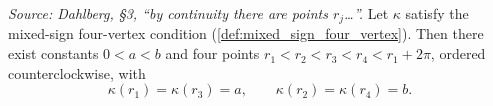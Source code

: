 \begin{lemma}

  \label{lem:dahlberg_alignment_data}
  \textit{Source: Dahlberg, §3, ``by continuity there are points $r_j$\ldots''.}
  Let $\kappa$ satisfy the mixed-sign four-vertex condition
  (\cref{def:mixed_sign_four_vertex}). Then there exist constants $0<a<b$ and four
  points $r_1<r_2<r_3<r_4<r_1+2\pi$, ordered counterclockwise, with
  \[
    \kappa(r_1)=\kappa(r_3)=a,\qquad \kappa(r_2)=\kappa(r_4)=b.
  \]
\end{lemma}
